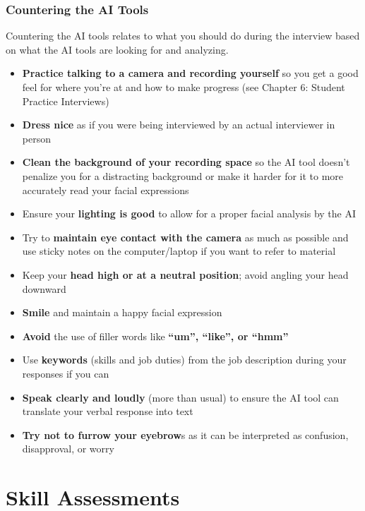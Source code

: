 \documentclass[
]{book}
\begin{document}
\hypertarget{countering-the-ai-tools}{%
\subsection{Countering the AI Tools}\label{countering-the-ai-tools}}

Countering the AI tools relates to what you should do during the interview based on what the AI tools are looking for and analyzing.

\begin{itemize}
\item
  \textbf{Practice talking to a camera and recording yourself} so you get a good feel for where you're at and how to make progress (see Chapter 6: Student Practice Interviews)
\item
  \textbf{Dress nice} as if you were being interviewed by an actual interviewer in person
\item
  \textbf{Clean the background of your recording space} so the AI tool doesn't penalize you for a distracting background or make it harder for it to more accurately read your facial expressions
\item
  Ensure your \textbf{lighting is good} to allow for a proper facial analysis by the AI
\item
  Try to \textbf{maintain eye contact with the camera} as much as possible and use sticky notes on the computer/laptop if you want to refer to material
\item
  Keep your \textbf{head high or at a neutral position}; avoid angling your head downward
\item
  \textbf{Smile} and maintain a happy facial expression
\item
  \textbf{Avoid} the use of filler words like \textbf{``um'', ``like'', or ``hmm''}
\item
  Use \textbf{keywords} (skills and job duties) from the job description during your responses if you can
\item
  \textbf{Speak clearly and loudly} (more than usual) to ensure the AI tool can translate your verbal response into text
\item
  \textbf{Try not to furrow your eyebrow}s as it can be interpreted as confusion, disapproval, or worry
\end{itemize}

\hypertarget{skill-assessments}{%
\chapter{Skill Assessments}\label{skill-assessments}}
\end{document}
